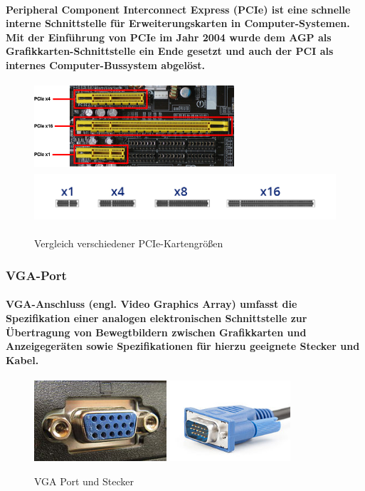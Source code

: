 \documentclass[a4paper]{article}
\begin{document}
    \paragraph{\color{codegreen}Peripheral Component Interconnect Express (PCIe) ist eine schnelle interne Schnittstelle für Erweiterungskarten in Computer-Systemen. Mit der Einführung von PCIe im Jahr 2004 wurde dem AGP als Grafikkarten-Schnittstelle ein Ende gesetzt und auch der PCI als internes Computer-Bussystem abgelöst.}
    \begin{center}
        \begin{figure}[H]
            \centering
            \includegraphics[height=3cm]{media/pcie}
            \includegraphics[height=2cm]{media/pci2}
            \captionsetup{labelformat=empty}
            \caption{Vergleich verschiedener PCIe-Kartengrößen }
            \label{fig:pcie}
        \end{figure}
    \end{center}
    \subsubsection{\color{codegreen}VGA-Port}
    \paragraph{\color{codegreen}VGA-Anschluss (engl. Video Graphics Array) umfasst die Spezifikation einer analogen elektronischen Schnittstelle zur Übertragung von Bewegtbildern zwischen Grafikkarten und Anzeigegeräten sowie Spezifikationen für hierzu geeignete Stecker und Kabel.}
    \begin{center}
        \begin{figure}[H]
            \centering
            \includegraphics[height=3cm]{media/VGA}
            \includegraphics[height=3cm]{media/VGA-cable}
            \captionsetup{labelformat=empty}
            \caption{VGA Port und Stecker}
            \label{fig:VGA}
        \end{figure}
    \end{center}
\end{document}
